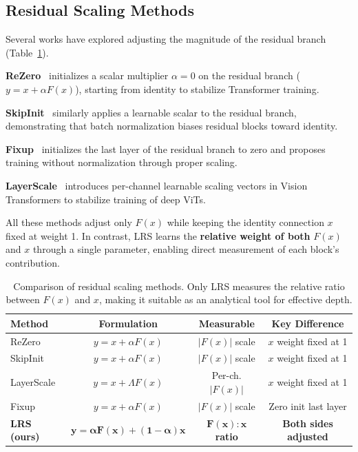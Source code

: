 \documentclass[preprint,12pt]{elsarticle}
\begin{document}
\subsection{Residual Scaling Methods}

Several works have explored adjusting the magnitude of the residual branch (Table~\ref{tab:comparison}).

\textbf{ReZero}~\cite{bachlechner2021rezero} initializes a scalar multiplier $\alpha = 0$ on the residual branch ($y = x + \alpha F(x)$), starting from identity to stabilize Transformer training.

\textbf{SkipInit}~\cite{de2020batch} similarly applies a learnable scalar to the residual branch, demonstrating that batch normalization biases residual blocks toward identity.

\textbf{Fixup}~\cite{zhang2019fixup} initializes the last layer of the residual branch to zero and proposes training without normalization through proper scaling.

\textbf{LayerScale}~\cite{touvron2021going} introduces per-channel learnable scaling vectors in Vision Transformers to stabilize training of deep ViTs.

All these methods adjust only $F(x)$ while keeping the identity connection $x$ fixed at weight 1. In contrast, LRS learns the \textbf{relative weight of both} $F(x)$ and $x$ through a single parameter, enabling direct measurement of each block's contribution.

\begin{table}[t]
\centering
\caption{Comparison of residual scaling methods. Only LRS measures the relative ratio between $F(x)$ and $x$, making it suitable as an analytical tool for effective depth.}
\label{tab:comparison}
\begin{tabular}{lccc}
\toprule
\textbf{Method} & \textbf{Formulation} & \textbf{Measurable} & \textbf{Key Difference} \\
\midrule
ReZero & $y = x + \alpha F(x)$ & $|F(x)|$ scale & $x$ weight fixed at 1 \\
SkipInit & $y = x + \alpha F(x)$ & $|F(x)|$ scale & $x$ weight fixed at 1 \\
LayerScale & $y = x + \Lambda F(x)$ & Per-ch. $|F(x)|$ & $x$ weight fixed at 1 \\
Fixup & $y = x + \alpha F(x)$ & $|F(x)|$ scale & Zero init last layer \\
\textbf{LRS (ours)} & $\mathbf{y = \alpha F(x) + (1{-}\alpha)x}$ & $\mathbf{F(x):x}$ \textbf{ratio} & \textbf{Both sides adjusted} \\
\bottomrule
\end{tabular}
\end{table}
\end{document}
